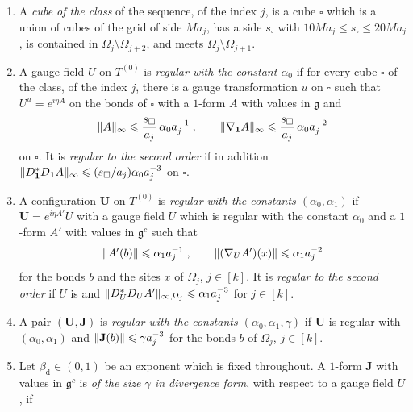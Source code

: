 \documentclass[11pt]{preprint}
\newcommand{\id}{\mathbf 1}
\DeclarePairedDelimiter{\norm}{\lVert}{\rVert}
\numberwithin{equation}{section}
\begin{document}
\begin{definition}\label{def:regular-pairs}
\begin{enumerate}[label=(\roman*)]
\item A \emph{cube of the class} of the sequence, of the index $j$, is a cube $\square$ which is a union of cubes of the grid of side $Ma_j$, has a side $s_\square$ with $10Ma_j \leqslant s_\square \leqslant 20Ma_j$, is contained in $\Omega_j \setminus \Omega_{j+2}$, and meets $\Omega_j \setminus \Omega_{j+1}$.
\item A gauge field $U$ on $T^{(0)}$ is \emph{regular with the constant $\alpha_0$} if for every cube $\square$ of the class, of the index $j$, there is a gauge transformation $u$ on $\square$ such that $U^u = e^{i\eta A}$ on the bonds of $\square$ with a $1$-form $A$ with values in $\mathfrak g$ and
\begin{equation}\label{eq:regular}
    \norm A_\infty\leqslant \frac{s_\square}{a_j}\,\alpha_0a_j^{-1}\;,
    \qquad
    \norm{\nabla_{\id}A}_\infty \leqslant \frac{s_\square}{a_j}\,\alpha_0a_j^{-2}
\end{equation}
on $\square$. It is \emph{regular to the second order} if in addition $\norm{D^*_{\id}D_{\id}A}_\infty \leqslant (s_\square/a_j)\alpha_0a_j^{-3}$ on $\square$.
\item A configuration $\mathbf U$ on $T^{(0)}$ is \emph{regular with the constants $(\alpha_0, \alpha_1)$} if $\mathbf U = e^{i\eta A'}U$ with a gauge field $U$ which is regular with the constant $\alpha_0$ and a $1$-form $A'$ with values in $\mathfrak g^c$ such that
\begin{equation}\label{eq:regular-complex}
    \norm{A'(b)} \leqslant \alpha_1a_j^{-1}\;,
    \qquad
    \norm{(\nabla_UA')(x)} \leqslant \alpha_1a_j^{-2}
\end{equation}
for the bonds $b$ and the sites $x$ of $\Omega_j$, $j \in [k]$. It is \emph{regular to the second order} if $U$ is and $\norm{D^*_UD_UA'}_{\infty,\Omega_j} \leqslant \alpha_1a_j^{-3}$ for $j \in [k]$.
\item A pair $(\mathbf U, \mathbf J)$ is \emph{regular with the constants $(\alpha_0, \alpha_1, \gamma)$} if $\mathbf U$ is regular with $(\alpha_0, \alpha_1)$ and $\norm{\mathbf J(b)} \leqslant \gamma a_j^{-3}$ for the bonds $b$ of $\Omega_j$, $j \in [k]$.
\item Let $\beta_{\mathrm d} \in (0, 1)$ be an exponent which is fixed throughout. A $1$-form $\mathbf J$ with values in $\mathfrak g^c$ is \emph{of the size $\gamma$ in divergence form}, with respect to a gauge field $U$, if

\end{enumerate}
\end{definition}
\end{document}
